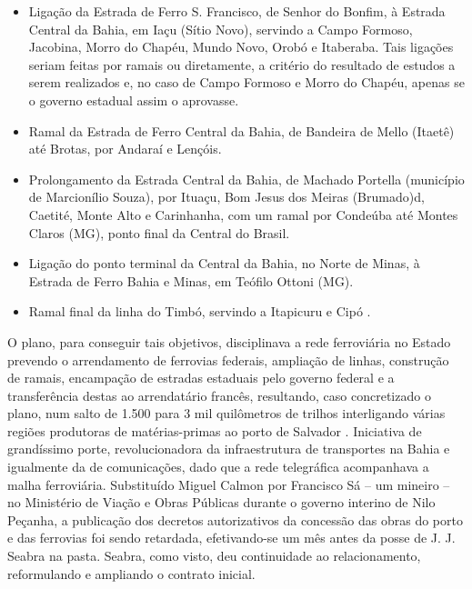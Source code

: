 \begin{itemize}
\item Ligação da Estrada de Ferro S. Francisco, de Senhor do Bonfim, à Estrada Central da Bahia, em Iaçu (Sítio Novo), servindo a Campo Formoso, Jacobina, Morro do Chapéu, Mundo Novo, Orobó e Itaberaba. Tais ligações seriam feitas por ramais ou diretamente, a critério do resultado de estudos a serem realizados e, no caso de Campo Formoso e Morro do Chapéu, apenas se o governo estadual assim o aprovasse.
\item Ramal da Estrada de Ferro Central da Bahia, de Bandeira de Mello (Itaetê) até Brotas, por Andaraí e Lençóis.
\item Prolongamento da Estrada Central da Bahia, de Machado Portella (município de Marcionílio Souza), por Ituaçu, Bom Jesus dos Meiras (Brumado)d, Caetité, Monte Alto e Carinhanha, com um ramal por Condeúba até Montes Claros (MG), ponto final da Central do Brasil.
\item Ligação do ponto terminal da Central da Bahia, no Norte de Minas, à Estrada de Ferro Bahia e Minas, em Teófilo Ottoni (MG).
\item Ramal final da linha do Timbó, servindo a Itapicuru e Cipó \cite[pp.~215-217]{joaci_porto_2016}.
\end{itemize}

O plano, para conseguir tais objetivos, disciplinava a rede ferroviária no Estado prevendo o arrendamento de ferrovias federais, ampliação de linhas, construção de ramais, encampação de estradas estaduais pelo governo federal e a transferência destas ao arrendatário francês, resultando, caso concretizado o plano, num salto de 1.500 para 3 mil quilômetros de trilhos interligando várias regiões produtoras de matérias-primas ao porto de Salvador \cite[pp.~217]{joaci_porto_2016}. Iniciativa de grandíssimo porte, revolucionadora da infraestrutura de transportes na Bahia e igualmente da de comunicações, dado que a rede telegráfica acompanhava a malha ferroviária. Substituído Miguel Calmon por Francisco Sá -- um mineiro -- no Ministério de Viação e Obras Públicas durante o governo interino de Nilo Peçanha, a publicação dos decretos autorizativos da concessão das obras do porto e das ferrovias foi sendo retardada, efetivando-se um mês antes da posse de J. J. Seabra na pasta. Seabra, como visto, deu continuidade ao relacionamento, reformulando e ampliando o contrato inicial.

